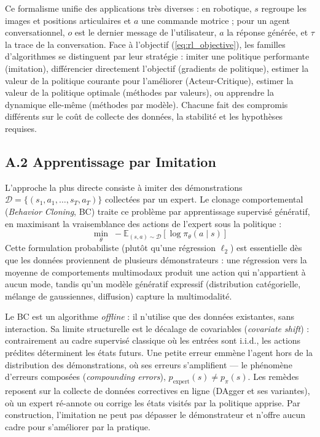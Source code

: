 \documentclass[11pt,a4paper]{article}
\begin{document}
Ce formalisme unifie des applications très diverses : en robotique, $s$ regroupe les images et positions articulaires et $a$ une commande motrice ; pour un agent conversationnel, $o$ est le dernier message de l'utilisateur, $a$ la réponse générée, et $\tau$ la trace de la conversation. Face à l'objectif (\ref{eq:rl_objective}), les familles d'algorithmes se distinguent par leur stratégie : imiter une politique performante (imitation), différencier directement l'objectif (gradients de politique), estimer la valeur de la politique courante pour l'améliorer (Acteur-Critique), estimer la valeur de la politique optimale (méthodes par valeurs), ou apprendre la dynamique elle-même (méthodes par modèle). Chacune fait des compromis différents sur le coût de collecte des données, la stabilité et les hypothèses requises.

\subsection*{A.2 Apprentissage par Imitation}
L'approche la plus directe consiste à imiter des démonstrations $\mathcal{D} = \{(s_1, a_1, \dots, s_T, a_T)\}$ collectées par un expert. Le clonage comportemental (\emph{Behavior Cloning}, BC) traite ce problème par apprentissage supervisé génératif, en maximisant la vraisemblance des actions de l'expert sous la politique :
\begin{equation}
\min_\theta \; -\mathbb{E}_{(s,a) \sim \mathcal{D}} \left[ \log \pi_\theta(a \mid s) \right]
\label{eq:bc}
\end{equation}
Cette formulation probabiliste (plutôt qu'une régression $\ell_2$) est essentielle dès que les données proviennent de plusieurs démonstrateurs : une régression vers la moyenne de comportements multimodaux produit une action qui n'appartient à aucun mode, tandis qu'un modèle génératif expressif (distribution catégorielle, mélange de gaussiennes, diffusion) capture la multimodalité.

Le BC est un algorithme \emph{offline} : il n'utilise que des données existantes, sans interaction. Sa limite structurelle est le décalage de covariables (\emph{covariate shift}) : contrairement au cadre supervisé classique où les entrées sont i.i.d., les actions prédites déterminent les états futurs. Une petite erreur emmène l'agent hors de la distribution des démonstrations, où ses erreurs s'amplifient — le phénomène d'erreurs composées (\emph{compounding errors}), $p_{\text{expert}}(s) \neq p_\pi(s)$. Les remèdes reposent sur la collecte de données correctives en ligne (DAgger et ses variantes), où un expert ré-annote ou corrige les états visités par la politique apprise. Par construction, l'imitation ne peut pas dépasser le démonstrateur et n'offre aucun cadre pour s'améliorer par la pratique.
\end{document}
